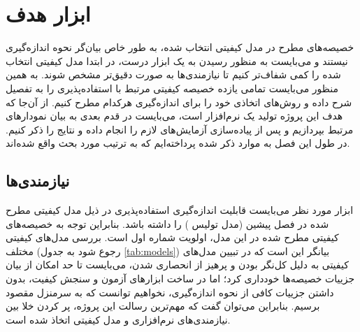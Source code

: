 \chapter{ابزار هدف}
خصیصه‌های مطرح در مدل کیفیتی انتخاب شده، به طور خاص بیان‌گر نحوه اندازه‌گیری نیستند و می‌بایست به منظور رسیدن به یک ابزار درست، در ابتدا مدل‌ کیفیتی انتخاب شده را کمی شفاف‌تر کنیم تا نیازمندی‌ها به صورت دقیق‌تر مشخص شوند. به همین منظور می‌بایست تمامی یازده خصیصه کیفیتی مرتبط با استفاده‌پذیری را به تفصیل شرح داده و روش‌های اتخاذی خود را برای اندازه‌گیری هرکدام مطرح کنیم. از آن‌جا که هدف این پروژه تولید یک نرم‌افزار است، می‌بایست در قدم بعدی به بیان نمودارهای مرتبط بپردازیم و پس از پیاده‌سازی آزمایش‌های لازم را انجام داده و نتایج را ذکر کنیم. در طول این فصل به موارد ذکر شده پرداخته‌ایم که به ترتیب مورد بحث واقع شده‌اند.
\section{نیازمندی‌ها}
ابزار مورد نظر می‌بایست قابلیت اندازه‌گیری استفاده‌پذیری در ذیل مدل کیفیتی مطرح شده در فصل پیشین (مدل تولیس
\cite{albert_measuring_2013})
را داشته باشد. بنابراین توجه به خصیصه‌های کیفیتی مطرح شده در این مدل، اولویت شماره اول است. بررسی مدل‌های کیفیتی مختلف (رجوع شود به جدول
\ref{tab:models})
بیانگر این است که در تبیین مدل‌های کیفیتی به دلیل کل‌نگر بودن و پرهیز از انحصاری شدن، می‌بایست تا حد امکان از بیان جزییات خصیصه‌ها خودداری کرد؛ اما در ساخت ابزارهای آزمون و سنجش کیفیت، بدون داشتن جزییات کافی از نحوه اندازه‌گیری، نخواهیم توانست که به سرمنزل مقصود برسیم. بنابراین می‌توان گفت که مهم‌ترین رسالت این پروژه، پر کردن خلا بین نیازمندی‌های نرم‌افزاری و مدل کیفیتی اتخاذ شده است.
